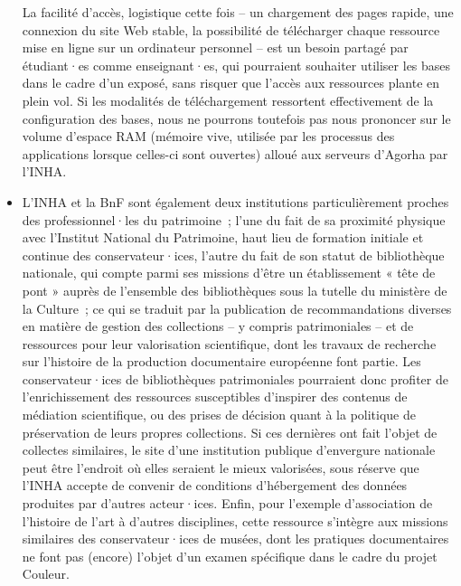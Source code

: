 \documentclass[a4paper,12pt, twoside]{book}
\begin{document}
\begin{itemize}
    \medskip
    
    La facilité d’accès, logistique cette fois – un chargement des pages rapide, une connexion du site Web stable, la possibilité de télécharger chaque ressource mise en ligne sur un ordinateur personnel – est un besoin partagé par étudiant·es comme enseignant·es, qui pourraient souhaiter utiliser les bases dans le cadre d’un exposé, sans risquer que l’accès aux ressources plante en plein vol. Si les modalités de téléchargement ressortent effectivement de la configuration des bases, nous ne pourrons toutefois pas nous prononcer sur le volume d’espace RAM (mémoire vive, utilisée par les processus des applications lorsque celles-ci sont ouvertes) alloué aux serveurs d’Agorha par l’INHA.\\

    \item L’INHA et la BnF sont également deux institutions particulièrement proches des professionnel·les du patrimoine~; l’une du fait de sa proximité physique avec l’Institut National du Patrimoine, haut lieu de formation initiale et continue des conservateur·ices, l’autre du fait de son statut de bibliothèque nationale, qui compte parmi ses missions d’être un établissement « tête de pont » auprès de l’ensemble des bibliothèques sous la tutelle du ministère de la Culture~; ce qui se traduit par la publication de recommandations diverses en matière de gestion des collections -- y compris patrimoniales – et de ressources pour leur valorisation scientifique, dont les travaux de recherche sur l’histoire de la production documentaire européenne font partie. Les conservateur·ices de bibliothèques patrimoniales pourraient donc profiter de l’enrichissement des ressources susceptibles d’inspirer des contenus de médiation scientifique, ou des prises de décision quant à la politique de préservation de leurs propres collections. Si ces dernières ont fait l’objet de collectes similaires, le site d’une institution publique d’envergure nationale peut être l’endroit où elles seraient le mieux valorisées, sous réserve que l’INHA accepte de convenir de conditions d’hébergement des données produites par d’autres acteur·ices. Enfin, pour l’exemple d’association de l’histoire de l’art à d’autres disciplines, cette ressource s’intègre aux missions similaires des conservateur·ices de musées, dont les pratiques documentaires ne font pas (encore) l’objet d’un examen spécifique dans le cadre du projet Couleur.\\


\end{itemize}
\end{document}
